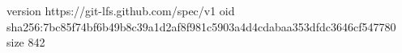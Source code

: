 version https://git-lfs.github.com/spec/v1
oid sha256:7bc85f74bf6b49b8c39a1d2af8f981c5903a4d4cdabaa353dfdc3646cf547780
size 842
